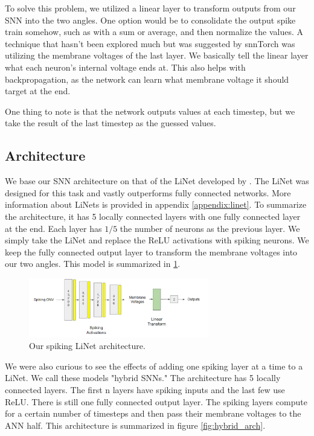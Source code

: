 \documentclass[../taasin.tex]{subfiles}
\begin{document}

To solve this problem, we utilized a linear layer to transform outputs from our SNN into the two angles. One option would be to consolidate the output spike train somehow, such as with a sum or average, and then normalize the values. A technique that hasn't been explored much but was suggested by snnTorch was utilizing the membrane voltages of the last layer. We basically tell the linear layer what each neuron's internal voltage ends at. This also helps with backpropagation, as the network can learn what membrane voltage it should target at the end.

One thing to note is that the network outputs values at each timestep, but we take the result of the last timestep as the guessed values.


\subsection{Architecture}

We base our SNN architecture on that of the LiNet developed by \cite{Masaki}. The LiNet was designed for this task and vastly outperforms fully connected networks. More information about LiNets is provided in appendix \ref{appendix:linet}. To summarize the architecture, it has 5 locally connected layers with one fully connected layer at the end. Each layer has $1/5$ the number of neurons as the previous layer. We simply take the LiNet and replace the ReLU activations with spiking neurons. We keep the fully connected output layer to transform the membrane voltages into our two angles. This model is summarized in \ref{fig:linet_arch}.

\begin{figure}[h]
    \centering
    \includegraphics[width=0.7\textwidth]{figures/arch_spiking.pdf}
    \caption{Our spiking LiNet architecture.}
    \label{fig:linet_arch}
\end{figure}

We were also curious to see the effects of adding one spiking layer at a time to a LiNet. We call these models "hybrid SNNs." The architecture has 5 locally connected layers. The first n layers have spiking inputs and the last few use ReLU. There is still one fully connected output layer. The spiking layers compute for a certain number of timesteps and then pass their membrane voltages to the ANN half. This architecture is summarized in figure \ref{fig:hybrid_arch}.
\end{document}
